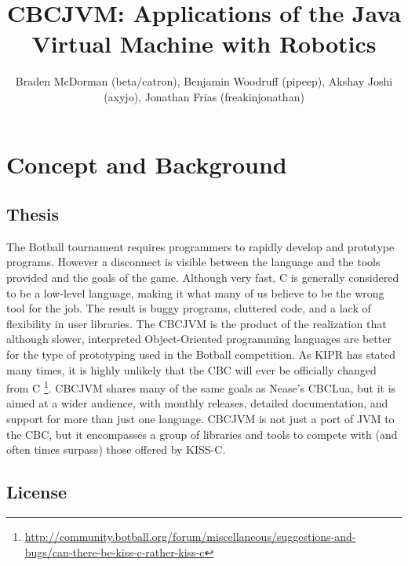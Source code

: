 \documentclass[12pt,letterpaper]{article}
\title{CBCJVM: Applications of the Java Virtual Machine with Robotics}
\author{Braden McDorman (beta/catron), Benjamin Woodruff (pipeep), Akshay Joshi (axyjo), Jonathan Frias (freakinjonathan)}
\newcommand{\urlfootnote}[1]{\footnote{\url{#1}}}
\begin{document}
\makeatletter
\begin{flushleft}\begin{small}
\@title\vspace{.5em}

\@author\vspace{.5em}

\authInfo
\end{small}\end{flushleft}\vspace{.25in}
\begin{center}
\begin{Large}
\textbf{\@title}
\end{Large}
\end{center}
\makeatother

\section{Concept and Background}

\subsection{Thesis}

The Botball tournament requires programmers to rapidly develop and prototype programs. However a disconnect is visible between the language and the tools provided and the goals of the game. Although very fast, C is generally considered to be a low-level language, making it what many of us believe to be the wrong tool for the job. The result is buggy programs, cluttered code, and a lack of flexibility in user libraries. The CBCJVM is the product of the realization that although slower, interpreted Object-Oriented programming languages are better for the type of prototyping used in the Botball competition. As KIPR has stated many times, it is highly unlikely that the CBC will ever be officially changed from C \urlfootnote{http://community.botball.org/forum/miscellaneous/suggestions-and-bugs/can-there-be-kiss-c-rather-kiss-c}. CBCJVM shares many of the same goals as Nease's CBCLua, but it is aimed at a wider audience, with monthly releases, detailed documentation, and support for more than just one language. CBCJVM is not just a port of JVM to the CBC, but it encompasses a group of libraries and tools to compete with (and often times surpass) those offered by KISS-C.



\subsection{License}
\end{document}
